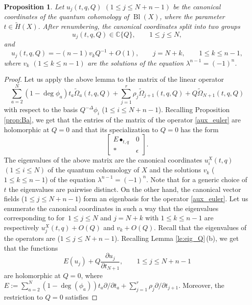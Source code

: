 \documentclass[pdftex]{sigma}
\numberwithin{equation}{section}
\newtheorem{Proposition}[Theorem]{Proposition}
\newcommand{\CC}{\mathbb{C}}
\begin{document}
\begin{Proposition}\label{prop:can-Q_exp}
Let $u_j(t,q,Q)$ $(1\leq j\leq N+n-1)$ be the canonical coordinates of the quantum cohomology of $\operatorname{Bl}(X)$, where the parameter $t\in \widetilde{H}(X)$. After renumbering, the canonical coordinates split into two groups
\[
u_j(t,q,Q)\in \CC\{Q\},\qquad 1\leq j\leq N,
\]
and
\[
u_j(t,q,Q)=-(n-1)v_k Q^{-1}+O(1),\qquad j=N+k,\qquad 1\leq k\leq n-1,
\]
where $v_k$ $(1\leq k\leq n-1)$ are the solutions of the equation $\lambda^{n-1}=(-1)^n$.
\end{Proposition}
\begin{proof}
Let us apply the above lemma to the matrix of the linear operator
\begin{equation}\label{aux_euler}
\sum_{a=2}^N (1-\operatorname{deg}\phi_a)
t_a \widetilde{\Omega}_a(t,q,Q) +
\sum_{j=1}^r \rho_j \widetilde{\Omega}_{j+1}(t,q,Q)+
Q\widetilde{\Omega}_{N+1}(t,q,Q)
\end{equation}
with respect to the basis $Q^{-\Delta }\phi_i$ ($1\leq i\leq N+n-1$). Recalling Proposition \ref{prop:Ba}, we get that the entries of the matrix of the operator \eqref{aux_euler} are holomorphic at $Q=0$ and that its specialization to $Q=0$ has the form
\[
\begin{bmatrix}
E\bullet_{t,q} & 0 \\
* & \epsilon
\end{bmatrix}.
\]
The eigenvalues of the above matrix are the canonical coordinates $u_i^X(t,q)$ $(1\leq i\leq N)$ of the quantum cohomology of $X$ and the solutions $v_k$ ($1\leq k\leq n-1$) of the equation $\lambda^{n-1}=(-1)^n$. Note that for a generic choice of $t$ the eigenvalues are pairwise distinct. On the other hand, the canonical vector fields  ($1\leq j\leq N+n-1$) form an eigenbasis for the operator \eqref{aux_euler}. Let us enumerate the canonical coordinates in such a way that the eigenvalues corresponding to  for~$1\leq j\leq N$ and $j=N+k$ with $1\leq k\leq n-1$ are respectively $u_j^X(t,q)+O(Q)$ and $v_k+O(Q)$. Recall that the eigenvalues of the operators  are  ($1\leq j\leq N+n-1$). Recalling Lemma \ref{le:eig_Q}\,(b), we get that the functions
\[
E(u_j) + Q\frac{\partial u_j}{\partial t_{N+1}}, \qquad 1\leq j\leq N+n-1
\]
are holomorphic at $Q=0$, where
$E:=
\sum_{a=2}^N (1-\operatorname{deg}(\phi_a)) t_a \partial/\partial {t_a} +
\sum_{j=1}^r \rho_j \partial/\partial t_{j+1}$. Moreover, the restriction to $Q=0$ satisfies

\end{proof}
\end{document}
